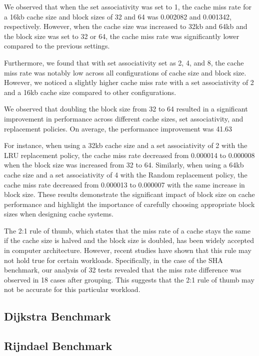 \documentclass[conference]{IEEEtran}
\begin{document}
We observed that when the set associativity was set to 1, the cache miss rate for a 16kb cache size and block sizes of 32 and 64 was 0.002082 and 0.001342, respectively. However, when the cache size was increased to 32kb and 64kb and the block size was set to 32 or 64, the cache miss rate was significantly lower compared to the previous settings.

Furthermore, we found that with set associativity set as 2, 4, and 8, the cache miss rate was notably low across all configurations of cache size and block size. However, we noticed a slightly higher cache miss rate with a set associativity of 2 and a 16kb cache size compared to other configurations.

We observed that doubling the block size from 32 to 64 resulted in a significant improvement in performance across different cache sizes, set associativity, and replacement policies. On average, the performance improvement was 41.63%

For instance, when using a 32kb cache size and a set associativity of 2 with the LRU replacement policy, the cache miss rate decreased from 0.000014 to 0.000008 when the block size was increased from 32 to 64. Similarly, when using a 64kb cache size and a set associativity of 4 with the Random replacement policy, the cache miss rate decreased from 0.000013 to 0.000007 with the same increase in block size. These results demonstrate the significant impact of block size on cache performance and highlight the importance of carefully choosing appropriate block sizes when designing cache systems.

The 2:1 rule of thumb, which states that the miss rate of a cache stays the same if the cache size is halved and the block size is doubled, has been widely accepted in computer architecture. However, recent studies have shown that this rule may not hold true for certain workloads. Specifically, in the case of the SHA benchmark, our analysis of 32 tests revealed that the miss rate difference was observed in 18 cases after grouping. This suggests that the 2:1 rule of thumb may not be accurate for this particular workload.

\subsection{Dijkstra Benchmark}


\subsection{Rijndael Benchmark}
\end{document}
